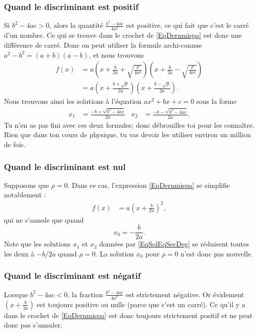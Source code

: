 \documentclass[a4paper,12pt]{book}
\theoremstyle{mes_exemples}	\newtheorem{exemple}[numtho]{Exemple}
\theoremstyle{mes_tho}
\begin{document}
\subsubsection{Quand le discriminant est positif}

Si $b^2-4ac>0$, alors la quantité $\frac{ b^2-4ac }{ 4a^2 }$ est positive, ce qui fait que c'est le carré d'un nombre. Ce qui se trouve dans le crochet de \eqref{EqDernmispa} est donc une différence de carré. Donc on peut utiliser la formule archi-connue $a^2-b^2=(a+b)(a-b)$, et nous trouvons
\begin{align*}
f(x)	&=a\left( x+\frac{ b }{ 2a }+\sqrt{\frac{\rho}{ 4a^2 }} \right)\left( x+\frac{ b }{ 2a }-\sqrt{\frac{\rho}{ 4a^2 }} \right)\\
	&=a\left( x+\frac{ b+\sqrt{\rho} }{ 2a } \right)\left( x+\frac{ b-\sqrt{\rho} }{ 2a } \right).
\end{align*}
Nous trouvons ainsi les solutions à l'équation $ax^2+bx+c=0$ sous la forme
\begin{align}		\label{EqSolEqSecDeg}
x_1&=\frac{ -b+\sqrt{b^2-4ac} }{ 2a }&x_2&=\frac{ -b-\sqrt{b^2-4ac} }{ 2a }.
\end{align}
Tu n'en as pas fini avec ces deux formules; donc débrouilles toi pour les connaître. Rien que dans ton cours de physique, tu vas devoir les utiliser environ un million de fois.

\subsubsection{Quand le discriminant est nul}

Supposons que $\rho=0$. Dans ce cas, l'expression \eqref{EqDernmispa} se simplifie notablement :
\begin{align*}
f(x)&=a\left( x+\frac{ b }{ 2a } \right)^2,
\end{align*}
qui ne s'annule que quand 
\[ 
  x_0=-\frac{ b }{ 2a }.
\]
Note que les solutions $x_1$ et $x_2$ données par \eqref{EqSolEqSecDeg} se réduisent toutes les deux à $-b/2a$ quand $\rho=0$. La solution $x_0$ pour $\rho=0$ n'est donc pas nouvelle.

\subsubsection{Quand le discriminant est négatif}

Lorsque $b^2-4ac<0$, la fraction $\frac{ b^2-4ac }{ 4a^2 }$ est strictement négative. Or évidement $\left( x+\frac{ b }{ 2a } \right)$ est toujours positive ou nulle (parce que c'est un carré). Ce qu'il y a dans le crochet de \eqref{EqDernmispa} est donc toujours strictement positif et ne peut donc pas s'annuler. 
\end{document}
